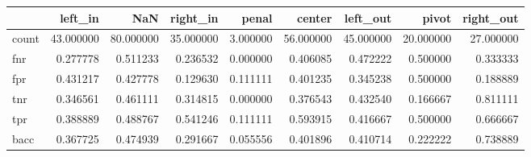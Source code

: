 \begin{tabular}{lrrrrrrrr}
\toprule
{} &    left\_in &        NaN &   right\_in &     penal &     center &   left\_out &      pivot &  right\_out \\
\midrule
count &  43.000000 &  80.000000 &  35.000000 &  3.000000 &  56.000000 &  45.000000 &  20.000000 &  27.000000 \\
fnr   &   0.277778 &   0.511233 &   0.236532 &  0.000000 &   0.406085 &   0.472222 &   0.500000 &   0.333333 \\
fpr   &   0.431217 &   0.427778 &   0.129630 &  0.111111 &   0.401235 &   0.345238 &   0.500000 &   0.188889 \\
tnr   &   0.346561 &   0.461111 &   0.314815 &  0.000000 &   0.376543 &   0.432540 &   0.166667 &   0.811111 \\
tpr   &   0.388889 &   0.488767 &   0.541246 &  0.111111 &   0.593915 &   0.416667 &   0.500000 &   0.666667 \\
bacc  &   0.367725 &   0.474939 &   0.291667 &  0.055556 &   0.401896 &   0.410714 &   0.222222 &   0.738889 \\
\bottomrule
\end{tabular}
